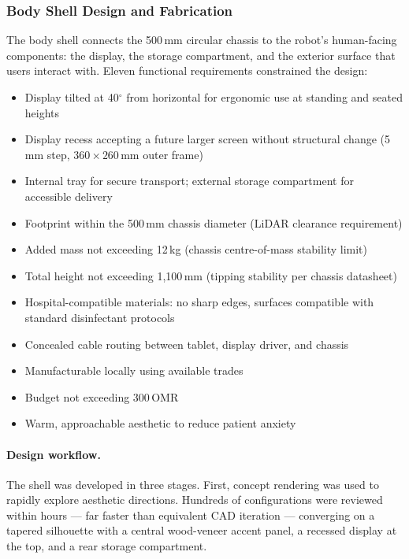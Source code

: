 \documentclass[11pt,a4paper]{article}
\begin{document}
\subsubsection{Body Shell Design and Fabrication}

The body shell connects the 500\,mm circular chassis to the robot's human-facing components: the display, the storage compartment, and the exterior surface that users interact with. Eleven functional requirements constrained the design:

\begin{itemize}
  \item Display tilted at 40$^{\circ}$ from horizontal for ergonomic use at standing and seated heights~\cite{frontiers2024}
  \item Display recess accepting a future larger screen without structural change (5\,mm step, $360\times260$\,mm outer frame)
  \item Internal tray for secure transport; external storage compartment for accessible delivery
  \item Footprint within the 500\,mm chassis diameter (LiDAR clearance requirement)
  \item Added mass not exceeding 12\,kg (chassis centre-of-mass stability limit)
  \item Total height not exceeding 1{,}100\,mm (tipping stability per chassis datasheet)
  \item Hospital-compatible materials: no sharp edges, surfaces compatible with standard disinfectant protocols~\cite{intel2024}
  \item Concealed cable routing between tablet, display driver, and chassis
  \item Manufacturable locally using available trades
  \item Budget not exceeding 300\,OMR
  \item Warm, approachable aesthetic to reduce patient anxiety~\cite{beran2013}
\end{itemize}

\paragraph{Design workflow.}
The shell was developed in three stages. First, concept rendering was used to rapidly explore aesthetic directions. Hundreds of configurations were reviewed within hours --- far faster than equivalent CAD iteration --- converging on a tapered silhouette with a central wood-veneer accent panel, a recessed display at the top, and a rear storage compartment.
\end{document}
